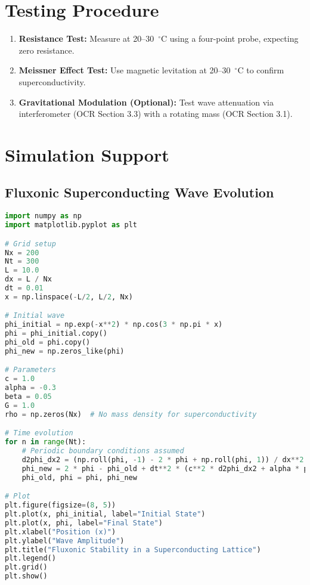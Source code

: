 \documentclass[a4paper,12pt]{article}
\begin{document}
\section{Testing Procedure}
\begin{enumerate}
    \item \textbf{Resistance Test:} Measure at 20--30~$^\circ$C using a four-point probe, expecting zero resistance.
    \item \textbf{Meissner Effect Test:} Use magnetic levitation at 20--30~$^\circ$C to confirm superconductivity.
    \item \textbf{Gravitational Modulation (Optional):} Test wave attenuation via interferometer (OCR Section 3.3) with a rotating mass (OCR Section 3.1).
\end{enumerate}

\section{Simulation Support}
\subsection{Fluxonic Superconducting Wave Evolution}
\begin{lstlisting}[language=Python, caption=Fluxonic Superconducting Wave Evolution, label=lst:superconductor]
import numpy as np
import matplotlib.pyplot as plt

# Grid setup
Nx = 200
Nt = 300
L = 10.0
dx = L / Nx
dt = 0.01
x = np.linspace(-L/2, L/2, Nx)

# Initial wave
phi_initial = np.exp(-x**2) * np.cos(3 * np.pi * x)
phi = phi_initial.copy()
phi_old = phi.copy()
phi_new = np.zeros_like(phi)

# Parameters
c = 1.0
alpha = -0.3
beta = 0.05
G = 1.0
rho = np.zeros(Nx)  # No mass density for superconductivity

# Time evolution
for n in range(Nt):
    # Periodic boundary conditions assumed
    d2phi_dx2 = (np.roll(phi, -1) - 2 * phi + np.roll(phi, 1)) / dx**2
    phi_new = 2 * phi - phi_old + dt**2 * (c**2 * d2phi_dx2 + alpha * phi + beta * phi**3 + 8 * np.pi * G * rho)
    phi_old, phi = phi, phi_new

# Plot
plt.figure(figsize=(8, 5))
plt.plot(x, phi_initial, label="Initial State")
plt.plot(x, phi, label="Final State")
plt.xlabel("Position (x)")
plt.ylabel("Wave Amplitude")
plt.title("Fluxonic Stability in a Superconducting Lattice")
plt.legend()
plt.grid()
plt.show()
\end{lstlisting}
\end{document}
